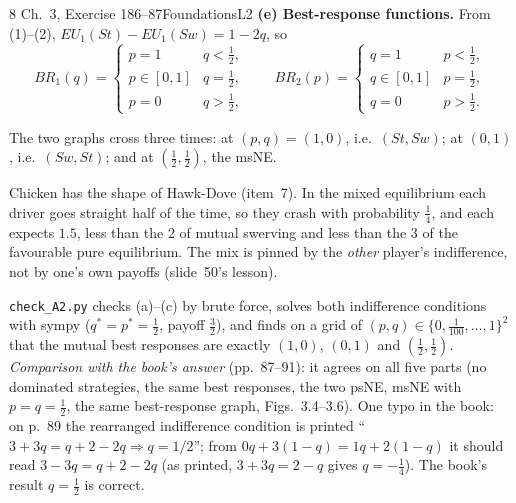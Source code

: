 \begin{exsol}{8}{\MG{} Ch.~3, Exercise 1}{86--87}{Foundations}{L2}
\textbf{(e) Best-response functions.} From (1)--(2), $EU_1(St) - EU_1(Sw) = 1 - 2q$, so
\[
  BR_1(q) = \begin{cases} p = 1 & q < \tfrac12,\\ p \in [0,1] & q = \tfrac12,\\ p = 0 & q > \tfrac12,\end{cases}
  \qquad
  BR_2(p) = \begin{cases} q = 1 & p < \tfrac12,\\ q \in [0,1] & p = \tfrac12,\\ q = 0 & p > \tfrac12.\end{cases}
\]
\begin{center}
\end{center}
The two graphs cross three times: at $(p,q) = (1,0)$, i.e.\ $(St,Sw)$; at $(0,1)$, i.e.\
$(Sw,St)$; and at $(\tfrac12,\tfrac12)$, the msNE.

\interp Chicken has the shape of Hawk-Dove (item~7). In the mixed equilibrium each driver goes
straight half of the time, so they crash with probability $\tfrac14$, and each expects $1.5$,
less than the $2$ of mutual swerving and less than the $3$ of the favourable pure equilibrium.
The mix is pinned by the \emph{other} player's indifference, not by one's own payoffs
(slide~50's lesson).

\verify \texttt{check\_A2.py} checks (a)--(c) by brute force, solves both indifference conditions
with sympy ($q^* = p^* = \tfrac12$, payoff $\tfrac32$), and finds on a grid of $(p,q) \in
\{0, \tfrac1{100}, \dots, 1\}^2$ that the mutual best responses are exactly $(1,0)$, $(0,1)$ and
$(\tfrac12,\tfrac12)$. \emph{Comparison with the book's answer} (pp.~87--91): it agrees on all five
parts (no dominated strategies, the same best responses, the two psNE, msNE with $p = q = \tfrac12$,
the same best-response graph, Figs.~3.4--3.6). One typo in the book: on p.~89 the rearranged
indifference condition is printed ``$3 + 3q = q + 2 - 2q \Rightarrow q = 1/2$''; from
$0q + 3(1-q) = 1q + 2(1-q)$ it should read $3 - 3q = q + 2 - 2q$ (as printed, $3 + 3q = 2 - q$ gives
$q = -\tfrac14$). The book's result $q = \tfrac12$ is correct.


\end{exsol}

